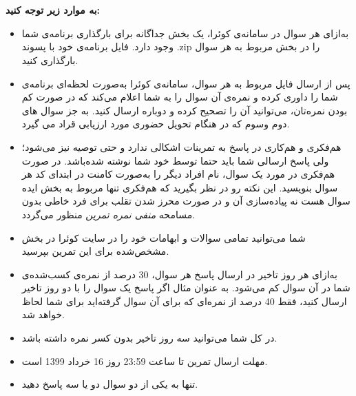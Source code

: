 \documentclass[]{article}
\begin{document}
 \Large \textbf{\\\\
به موارد زیر توجه کنید:}

\begin{itemize}[label=$\ast$]
\item به‌ازای هر سوال در سامانه‌ی کوئرا، یک بخش جداگانه برای بارگذاری برنامه‌ی شما وجود دارد. فایل برنامه‌ی خود با پسوند .zip را در بخش مربوط به هر سوال بارگذاری کنید.
\item پس از ارسال فایل مربوط به هر سوال، سامانه‌ی کوئرا به‌صورت لحظه‌ای برنامه‌ی شما را داوری کرده و نمره‌ی آن سوال را به شما اعلام می‌کند که در صورت کم بودن نمره‌تان، می‌توانید آن را تصحیح کرده و دوباره ارسال کنید. به جز سوال های دوم وسوم که در هنگام تحویل حضوری مورد ارزیابی قراد می گیرد.
\item هم‌فکری و هم‌کاری در پاسخ به تمرینات اشکالی ندارد و حتی توصیه نیز می‌شود؛ ولی پاسخ ارسالی شما باید حتما توسط خود شما نوشته شده‌باشد. در صورت هم‌فکری در مورد یک سوال، نام افراد دیگر را به‌صورت کامنت در ابتدای کد هر سوال بنویسید.  این نکته رو در نظر بگیرید که هم‌فکری تنها مربوط به بخش ایده سوال هست نه پیاده‌سازی آن و در صورت محرز شدن تقلب برای فرد خاطی بدون مسامحه \emph{ منفی نمره تمرین}
منظور می‌گردد. 
\item شما می‌توانید تمامی سوالات و ابهامات خود را در سایت کوئرا در بخش مشخص‌شده برای این تمرین بپرسید.
\item به‌ازای هر روز تاخیر در ارسال پاسخ هر سوال، 30 درصد از نمره‌ی کسب‌شده‌ی شما در آن سوال کم می‌شود. به عنوان مثال اگر پاسخ یک سوال را با دو روز تاخیر ارسال کنید، فقط 40 درصد از نمره‌ای که برای آن سوال گرفته‌اید برای شما لحاظ خواهد شد.
\item در کل شما می‌توانید سه روز تاخیر بدون کسر نمره داشته باشد.
\item مهلت ارسال تمرین تا ساعت 23:59 روز 16 خرداد 1399 است.
\item تنها به یکی از دو سوال دو یا سه پاسخ دهید.
\end{itemize}



\newpage
\end{document}
